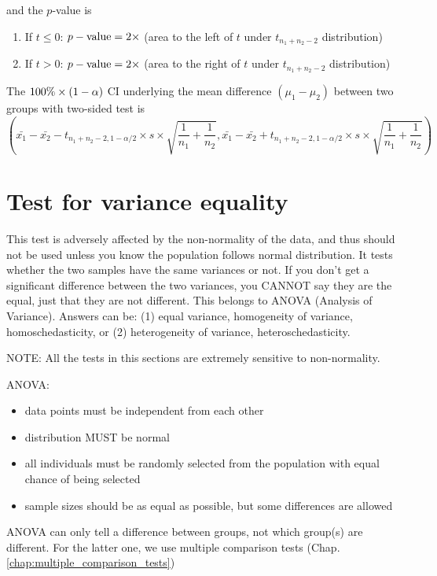 and the $p$-value is
\begin{enumerate}
\item If $ t\le 0$: $p-\text{value} =2\times $ (area to the left of $t$ under
  $t_{n_1+n_2-2}$ distribution)
\item If $ t > 0$: $p-\text{value} =2\times $ (area to the right of $t$ under
  $t_{n_1+n_2-2}$ distribution)
\end{enumerate}
The $100\%\times (1-\alpha)$ CI underlying the mean difference $(\mu_1-\mu_2)$ between
two groups with two-sided test is
\begin{equation}
  \label{eq:85}
  \left(\bar{x_1} - \bar{x_2} - t_{n_1+n_2-2, 1-\alpha/2} \times s
    \times \sqrt{\frac{1}{n_1}+\frac{1}{n_2}}, \bar{x_1} - \bar{x_2} +
    t_{n_1+n_2-2, 1-\alpha/2} \times s 
    \times \sqrt{\frac{1}{n_1}+\frac{1}{n_2}} \right)
\end{equation}

\section{Test for variance equality}
\label{sec:F-test_variance}

This test is adversely affected by the non-normality of the data, and thus
should not be used unless you know the population follows normal distribution. 
It tests whether the two samples have the same variances or not. If you don't
get a significant difference between the two variances, you CANNOT say they are 
the equal, just that they are not different. This belongs to ANOVA (Analysis of
Variance). Answers can be: (1) equal variance, homogeneity of variance,
homoschedasticity, or (2) heterogeneity of variance, heteroschedasticity. 

NOTE: All the tests in this sections are extremely sensitive to non-normality.

ANOVA:
\begin{itemize}
  \item data points must be independent from each other
  \item distribution MUST be normal
  \item all individuals must be randomly selected from the population with equal
  chance of being selected
  \item sample sizes should be as equal as possible, but some differences are
  allowed
\end{itemize}
ANOVA can only tell a difference between groups, not which group(s) are
different. For the latter one, we use multiple comparison tests
(Chap.\ref{chap:multiple_comparison_tests})
 
